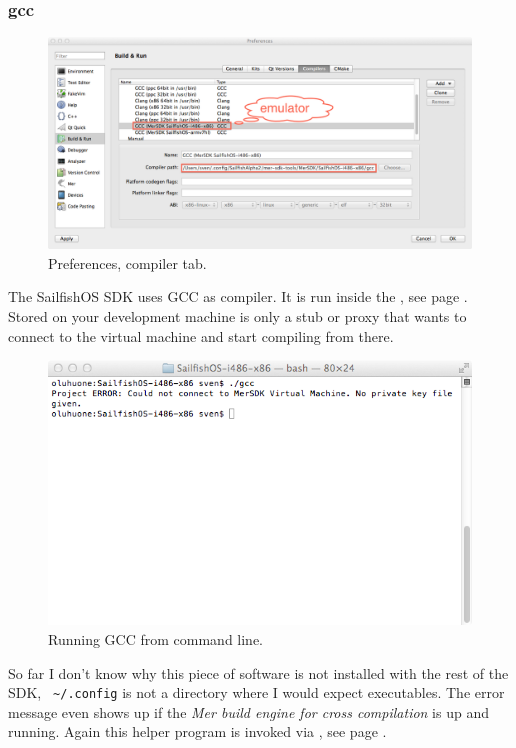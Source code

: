 \subsubsection{gcc}\label{subsubsec:compilers:gcc}
%
%
\begin{figure}[H]
  \centering
  \includegraphics[scale=0.35]{../media/gfx/QtCreator/Compilers.png} 
  \caption{Preferences, compiler tab.}
  \label{fig:creatorcompilers}
\end{figure}
%
The SailfishOS SDK uses GCC as compiler. It is run inside the , see page \pageref{subsec:MerSDK}. Stored on your development machine is only a stub or proxy that wants to connect to the virtual machine and start compiling from there.
%
\begin{figure}[H]
  \centering
  \includegraphics[scale=0.6]{../media/gfx/bash/gcc486.png} 
  \caption{Running GCC from command line.}
  \label{fig:gcc486commandline}
\end{figure}
%
So far I don't know why this piece of software is not installed with the rest of the SDK, \verb, ~/.config, is not a directory where I would expect executables. The error message even shows up if the \textit{Mer build engine for cross compilation} is up and running. Again this helper program is invoked via , see page \pageref{subsubsec:merssh}.

